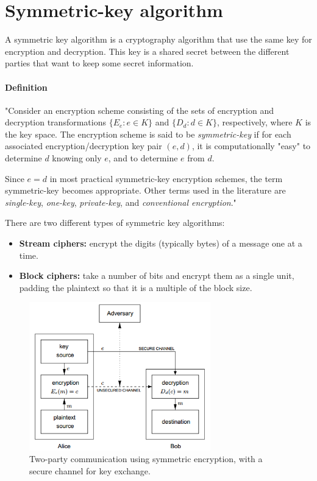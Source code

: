 \documentclass[a4paper,12pt,titlepage]{article}
\begin{document}
\section{Symmetric-key algorithm}

A symmetric key algorithm is a cryptography algorithm that use the same key for encryption and decryption. This key is a shared secret between the different parties that want to keep some secret information. \citep{wiki:symmetric-key}

\paragraph{Definition} 
"Consider an encryption scheme consisting of the sets of encryption and decryption transformations $\{E_e : e \in K\}$ and $\{D_d : d \in K\}$, respectively, where $K$ is the key space. The encryption scheme is said to be \textit{symmetric-key} if for each associated encryption/decryption key pair $(e, d)$, it is computationally "easy" to determine $d$ knowing only $e$, and to determine $e$ from $d$.

Since $e = d$ in most practical symmetric-key encryption schemes, the term symmetric-key becomes appropriate. Other terms used in the literature are \textit{single-key}, \textit{one-key}, \textit{private-key}, and \textit{conventional encryption}." \citep{menezes_handbook_1996}

There are two different types of symmetric key algorithms: \citep{wiki:symmetric-key}
\begin{itemize}[noitemsep]
\item \textbf{Stream ciphers:} encrypt the digits (typically bytes) of a message one at a time.
\item \textbf{Block ciphers:} take a number of bits and encrypt them as a single unit, padding the plaintext so that it is a multiple of the block size.
\end{itemize}

\begin{figure}[!ht]
	\centering
	\label{fig:symmetric-key}
	\includegraphics[width=0.7\textwidth]{symmetric-key.png}
	\caption{Two-party communication using symmetric encryption, with a secure channel for key exchange. \citep{menezes_handbook_1996}}
\end{figure}
\end{document}
